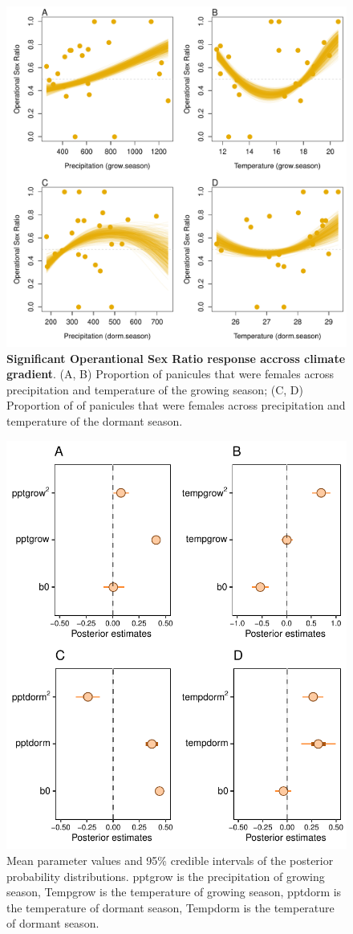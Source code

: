 \documentclass[12pt]{article}\usepackage[]{graphicx}\usepackage[dvipsnames]{xcolor}
\begin{document}
\begin{figure}[H]
  \begin{center}
    \includegraphics[width=0.80\linewidth]{Figures/gardens_OSR.pdf}
  \caption{\textbf{Significant Operantional Sex Ratio response accross climate gradient}.
  (A, B) Proportion of panicules that were females across precipitation and temperature of the growing season; (C, D) Proportion of of panicules that were females across precipitation and temperature of the dormant season.}
  \label{Sup:gardens_OSR}
  \end{center}
\end{figure}

\begin{figure}[H]
		\centering
		\includegraphics[width=0.75\linewidth]{Figures/Posterior_ORS.pdf}
		\caption{Mean parameter values and 95\% credible intervals of the posterior probability distributions. 
		pptgrow is  the precipitation of growing season,
		Tempgrow is the temperature of growing season,
		pptdorm is the temperature of dormant season,
		Tempdorm is the temperature of dormant season.}
		\label{Sup:PosteriorOSR}
\end{figure}
\end{document}
